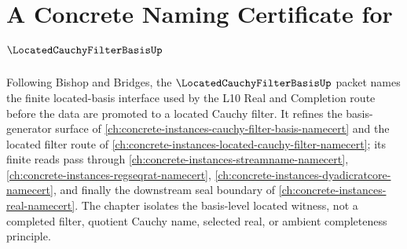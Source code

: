 \chapter[A Concrete Naming Certificate for LocatedCauchyFilterBasis]{A Concrete Naming Certificate for $\LocatedCauchyFilterBasisUp$}
\label{ch:concrete-instances-located-cauchy-filter-basis-namecert}

Following Bishop and Bridges, the $\LocatedCauchyFilterBasisUp$ packet names the finite located-basis interface used by the L10 Real and Completion route before the data are promoted to a located Cauchy filter. It refines the basis-generator surface of \autoref{ch:concrete-instances-cauchy-filter-basis-namecert} and the located filter route of \autoref{ch:concrete-instances-located-cauchy-filter-namecert}; its finite reads pass through \autoref{ch:concrete-instances-streamname-namecert}, \autoref{ch:concrete-instances-regseqrat-namecert}, \autoref{ch:concrete-instances-dyadicratcore-namecert}, and finally the downstream seal boundary of \autoref{ch:concrete-instances-real-namecert}. The chapter isolates the basis-level located witness, not a completed filter, quotient Cauchy name, selected real, or ambient completeness principle.

